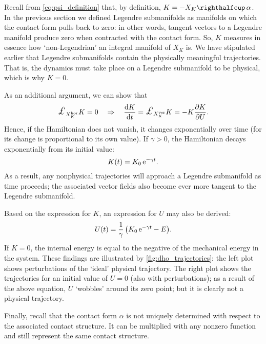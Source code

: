 Recall from \cref{eq:psi_definition} that, by definition, \(K = -\intpr{X_K}{\alpha}\). In the previous section we defined Legendre submanifolds as manifolds on which the contact form pulls back to zero: in other words, tangent vectors to a Legendre manifold produce zero when contracted with the contact form. So, \(K\) measures in essence how `non-Legendrian' an integral manifold of \(X_K\) is. We have stipulated earlier that Legendre submanifolds contain the physically meaningful trajectories. That is, the dynamics must take place on a Legendre submanifold to be physical, which is why \(K = 0\).

As an additional argument, we can show that
\begin{equation}
     \lied{X^{\text{hor}}_K}{K} = 0 \quad \Rightarrow \quad \dv{K}{t} = \lied{X^{\text{ver}}_K}{K} = -K\pdv{K}{U}.
\end{equation}
Hence, if the Hamiltonian does not vanish, it changes exponentially over time (for its change is proportional to its own value). If \(\gamma > 0\), the Hamiltonian decays exponentially from its initial value:
\begin{equation} 
    K(t) = K_0\,\mathrm{e}^{-\gamma t}.
    \label{eq:contact_ham_growth}
\end{equation}
As a result, any nonphysical trajectories will approach a Legendre submanifold as time proceeds; the associated vector fields also become ever more tangent to the Legendre submanifold. 

Based on the expression for \(K\), an expression for \(U\) may also be derived:
\begin{equation}
     U(t) = \frac{1}{\gamma}\,\qty( K_0\,\mathrm{e}^{-\gamma t} - E ).
\end{equation}
If \(K = 0\), the internal energy is equal to the negative of the mechanical energy in the system. These findings are illustrated by \cref{fig:dho_trajectories}: the left plot shows perturbations of the `ideal' physical trajectory. The right plot shows the trajectories for an initial value of \(U = 0\) (also with perturbations); as a result of the above equation, \(U\) `wobbles' around its zero point; but it is clearly not a physical trajectory.

Finally, recall that the contact form \(\alpha\) is not uniquely determined with respect to the associated contact structure. It can be multiplied with any nonzero function and still represent the same contact structure.

